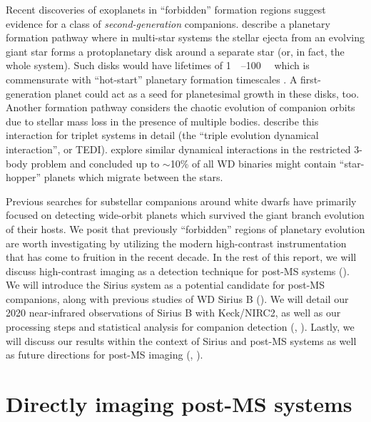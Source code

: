 \documentclass[twocolumn]{aastex631}
\begin{document}
Recent discoveries of exoplanets in ``forbidden'' formation regions \citep{vanderburgGiantPlanetCandidate2020,blackmanJovianAnalogueOrbiting2021} suggest evidence for a class of \textit{second-generation} companions. \citet{peretsSecondGenerationPlanets2010,peretsPlanetsEvolvedBinary2011} describe a planetary formation pathway where in multi-star systems the stellar ejecta from an evolving giant star forms a protoplanetary disk around a separate star (or, in fact, the whole system). Such disks would have lifetimes of \qtyrange{1}{100}{\mega\year} which is commensurate with ``hot-start'' planetary formation timescales \citep{spiegelSpectralPhotometricDiagnostics2012a}. A first-generation planet could act as a seed for planetesimal growth in these disks, too. Another formation pathway considers the chaotic evolution of companion orbits due to stellar mass loss in the presence of multiple bodies. \citet{peretsTripleEvolutionDynamical2012} describe this interaction for triplet systems in detail (the ``triple evolution dynamical interaction'', or TEDI). \citet{kratterStarHoppersPlanet2012} explore similar dynamical interactions in the restricted 3-body problem and concluded up to $\sim$10\% of all WD binaries might contain ``star-hopper'' planets which migrate between the stars.

Previous searches for substellar companions around white dwarfs \citep[e.g.,][]{debesAreThereUnstable2002,hoganDODOSurveyII2009,luhmanDiscoveryCandidateCoolest2011,xuExtremeAOSearchGiant2015a} have primarily focused on detecting wide-orbit planets which survived the giant branch evolution of their hosts. We posit that previously ``forbidden'' regions of planetary evolution are worth investigating by utilizing the modern high-contrast instrumentation that has come to fruition in the recent decade. In the rest of this report, we will discuss high-contrast imaging as a detection technique for post-MS systems (). We will introduce the Sirius system as a potential candidate for post-MS companions, along with previous studies of WD Sirius B (). We will detail our 2020 near-infrared observations of Sirius B with Keck/NIRC2, as well as our processing steps and statistical analysis for companion detection (, ). Lastly, we will discuss our results within the context of Sirius and post-MS systems as well as future directions for post-MS imaging (, ).


\section{Directly imaging post-MS systems}\label{sec:imaging}
\end{document}
